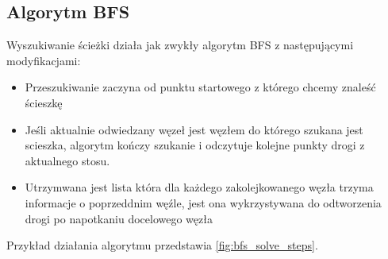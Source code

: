 \documentclass[../../../../doc.tex]{subfiles}
\begin{document}
\subsection{Algorytm BFS}

Wyszukiwanie ścieżki działa jak zwykły algorytm BFS z następującymi modyfikacjami:

\begin{itemize}
  \item Przeszukiwanie zaczyna od punktu startowego z którego chcemy znaleść ścieszkę
  \item Jeśli aktualnie odwiedzany węzeł jest węzłem do którego szukana jest scieszka,
        algorytm kończy szukanie i odczytuje kolejne punkty drogi z aktualnego stosu.
  \item Utrzymwana jest lista która dla każdego zakolejkowanego węzła trzyma informacje o poprzeddnim węźle,
        jest ona wykrzystywana do odtworzenia drogi po napotkaniu docelowego węzła
\end{itemize}


Przykład działania algorytmu przedstawia \cref{fig:bfs_solve_steps}.


\end{document}
